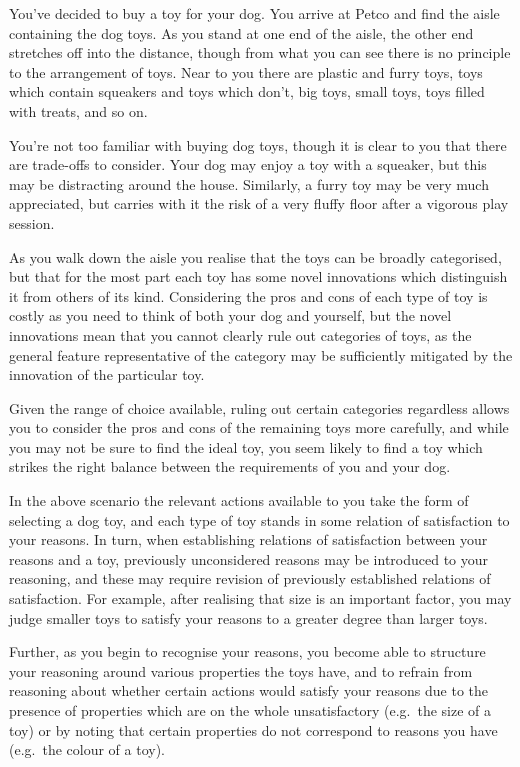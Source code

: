 \documentclass[10pt]{article}
\begin{document}
\begin{scenario}[Toys]\label{sc:toys}
  You've decided to buy a toy for your dog.
  You arrive at Petco and find the aisle containing the dog toys.
  As you stand at one end of the aisle, the other end stretches off into the distance, though from what you can see there is no principle to the arrangement of toys.
  Near to you there are plastic and furry toys, toys which contain squeakers and toys which don't, big toys, small toys, toys filled with treats, and so on.

  You're not too familiar with buying dog toys, though it is clear to you that there are trade-offs to consider.
  Your dog may enjoy a toy with a squeaker, but this may be distracting around the house.
  Similarly, a furry toy may be very much appreciated, but carries with it the risk of a very fluffy floor after a vigorous play session.

  As you walk down the aisle you realise that the toys can be broadly categorised, but that for the most part each toy has some novel innovations which distinguish it from others of its kind.
  Considering the pros and cons of each type of toy is costly as you need to think of both your dog and yourself, but the novel innovations mean that you cannot clearly rule out categories of toys, as the general feature representative of the category may be sufficiently mitigated by the innovation of the particular toy.

  Given the range of choice available, ruling out certain categories regardless allows you to consider the pros and cons of the remaining toys more carefully, and while you may not be sure to find the ideal toy, you seem likely to find a toy which strikes the right balance between the requirements of you and your dog.
\end{scenario}

In the above scenario the relevant actions available to you take the form of selecting a dog toy, and each type of toy stands in some relation of satisfaction to your reasons.
In turn, when establishing relations of satisfaction between your reasons and a toy, previously unconsidered reasons may be introduced to your reasoning, and these may require revision of previously established relations of satisfaction.
For example, after realising that size is an important factor, you may judge smaller toys to satisfy your reasons to a greater degree than larger toys.

Further, as you begin to recognise your reasons, you become able to structure your reasoning around various properties the toys have, and to refrain from reasoning about whether certain actions would satisfy your reasons due to the presence of properties which are on the whole unsatisfactory (e.g.\ the size of a toy) or by noting that certain properties do not correspond to reasons you have (e.g.\ the colour of a toy).
\end{document}

